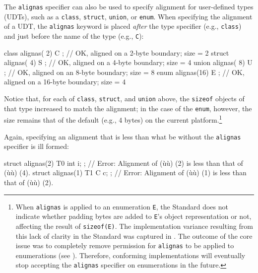 The \lstinline!alignas! specifier can also be used to specify alignment for
user-defined types (UDTs), such as a \lstinline!class!, \lstinline!struct!,
\lstinline!union!, or \lstinline!enum!. When specifying the alignment of a UDT,
 the \lstinline!alignas! keyword is placed \emph{after} the
type specifier (e.g., \lstinline!class!) and just before the name of the
type (e.g., \lstinline!C!):

\begin{emcppslisting}
class  alignas( 2) C { }; // OK, aligned on a  2-byte boundary; size = 2        
struct alignas( 4) S { }; // OK, aligned on a  4-byte boundary; size = 4        
union  alignas( 8) U { }; // OK, aligned on an 8-byte boundary; size = 8        
enum   alignas(16) E { }; // OK, aligned on a 16-byte boundary; size = 4
\end{emcppslisting}
    
\noindent Notice that, for each of \lstinline!class!, \lstinline!struct!, and
\lstinline!union! above, the \lstinline!sizeof! objects of that type increased
to match the alignment; in the case of the \lstinline!enum!, however, the
size remains that of the default  (e.g., 4
bytes) on the current platform.{\cprotect\footnote{When \lstinline!alignas!
is applied to an enumeration \lstinline!E!, the Standard does not
indicate whether padding bytes are added to \lstinline!E!'s object
representation or not, affecting the result of \lstinline!sizeof(E)!. The
implementation variance resulting from this lack of clarity in the
  Standard was captured in \cite{miller17}. The outcome of the core
  issue was to completely remove permission for \lstinline!alignas! to be
  applied to enumerations (see \cite{iso18a}). Therefore, conforming implementations will
  eventually stop accepting the \lstinline!alignas! specifier on
  enumerations in the future.}}

Again, specifying an alignment that is less than what be without the \lstinline!alignas! specifier is ill formed:

\begin{emcppslisting}
struct alignas(2) T0 { int i; };  
    // Error: Alignment of (ù{}ù) (2) is less than that of (ù{}ù) (4).
struct alignas(1) T1 { C c; };    
    // Error: Alignment of (ù{}ù) (1) is less than that of (ù{}ù) (2).
\end{emcppslisting}


